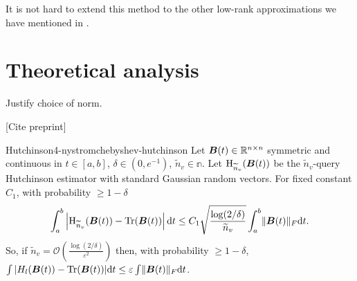 
It is not hard to extend this method to the other low-rank approximations
we have mentioned in .


\section{Theoretical analysis}
\label{sec:4-nystromchebyshev-analysis}

Justify choice of norm.


[Cite preprint]

\begin{lemma}{Hutchinson}{4-nystromchebyshev-hutchinson}
    Let $\boldsymbol{B}(t) \in \mathbb{R}^{n \times n}$ symmetric and continuous in $t \in [a, b]$, $\delta \in (0, e^{-1})$, $\widetilde{n}_v \in \mathbb{n}$. Let $\operatorname{H}_{\widetilde{n}_v}(\boldsymbol{B}(t))$ be the $\widetilde{n}_v$-query Hutchinson estimator with standard Gaussian random vectors. For fixed constant $C_1$, with probability $\geq 1 - \delta$
    \begin{equation}
        \int_{a}^{b} \left| \operatorname{H}_{\widetilde{n}_v}(\boldsymbol{B}(t))  - \operatorname{Tr}(\boldsymbol{B}(t)) \right| \mathrm{d}t \leq C_1 \sqrt{\frac{\log(2/\delta)}{\widetilde{n}_v}} \int_{a}^{b} \lVert \boldsymbol{B}(t) \rVert_F \mathrm{d}t.
    \end{equation}
    So, if $\widetilde{n}_v = \mathcal{O}\left( \frac{\log(2/\delta)}{\varepsilon^2} \right)$ then, with probability $\geq 1 - \delta$, $\int |H_l(\boldsymbol{B}(t)) - \operatorname{Tr}(\boldsymbol{B}(t))| \mathrm{d}t \leq \varepsilon \int \lVert \boldsymbol{B}(t) \rVert_F \mathrm{d}t$.
\end{lemma}

